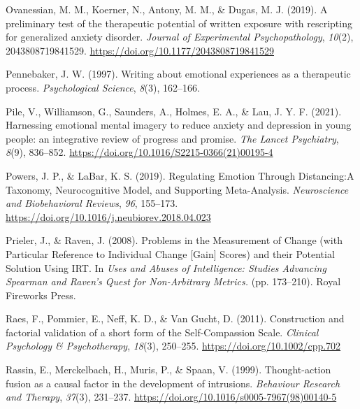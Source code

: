 \documentclass[
  man,floatsintext]{apa7}
\newlength{\cslhangindent}
\newlength{\cslentryspacingunit} %
\newenvironment{CSLReferences}[2] %
 {%
  \setlength{\parindent}{0pt}
  \ifodd #1
  \let\oldpar\par
  \def\par{\hangindent=\cslhangindent\oldpar}
  \fi
  \setlength{\parskip}{#2\cslentryspacingunit}
 }%
 {}
\begin{document}
\begin{CSLReferences}{1}{0}
\leavevmode{}%
Ovanessian, M. M., Koerner, N., Antony, M. M., \& Dugas, M. J. (2019). A preliminary test of the therapeutic potential of written exposure with rescripting for generalized anxiety disorder. \emph{Journal of Experimental Psychopathology}, \emph{10}(2), 2043808719841529. \url{https://doi.org/10.1177/2043808719841529}

\leavevmode{}%
Pennebaker, J. W. (1997). Writing about emotional experiences as a therapeutic process. \emph{Psychological Science}, \emph{8}(3), 162--166.

\leavevmode{}%
Pile, V., Williamson, G., Saunders, A., Holmes, E. A., \& Lau, J. Y. F. (2021). Harnessing emotional mental imagery to reduce anxiety and depression in young people: an integrative review of progress and promise. \emph{The Lancet Psychiatry}, \emph{8}(9), 836--852. \url{https://doi.org/10.1016/S2215-0366(21)00195-4}

\leavevmode{}%
Powers, J. P., \& LaBar, K. S. (2019). Regulating Emotion Through Distancing:A Taxonomy, Neurocognitive Model, and Supporting Meta-Analysis. \emph{Neuroscience and Biobehavioral Reviews}, \emph{96}, 155--173. \url{https://doi.org/10.1016/j.neubiorev.2018.04.023}

\leavevmode{}%
Prieler, J., \& Raven, J. (2008). Problems in the Measurement of Change (with Particular Reference to Individual Change {[}Gain{]} Scores) and their Potential Solution Using IRT. In \emph{Uses and Abuses of Intelligence: Studies Advancing Spearman and Raven's Quest for Non-Arbitrary Metrics.} (pp. 173--210). Royal Fireworks Press.

\leavevmode{}%
Raes, F., Pommier, E., Neff, K. D., \& Van Gucht, D. (2011). Construction and factorial validation of a short form of the Self-Compassion Scale. \emph{Clinical Psychology \& Psychotherapy}, \emph{18}(3), 250--255. \url{https://doi.org/10.1002/cpp.702}

\leavevmode{}%
Rassin, E., Merckelbach, H., Muris, P., \& Spaan, V. (1999). Thought-action fusion as a causal factor in the development of intrusions. \emph{Behaviour Research and Therapy}, \emph{37}(3), 231--237. \url{https://doi.org/10.1016/s0005-7967(98)00140-5}


\end{CSLReferences}
\end{document}
